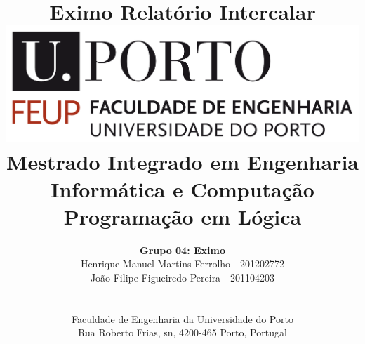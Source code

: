 \documentclass[a4paper]{article}
\begin{document}
\setlength{\textwidth}{16cm}
\setlength{\textheight}{22cm}

\title{\Huge\textbf{Eximo}\linebreak\linebreak\linebreak
\Large\textbf{Relatório Intercalar}\linebreak\linebreak
\linebreak\linebreak
\includegraphics[scale=0.1]{res/feup-logo.png}\linebreak\linebreak
\linebreak\linebreak
\Large{Mestrado Integrado em Engenharia Informática e Computação} \linebreak\linebreak
\Large{Programação em Lógica}\linebreak
}

\author{\textbf{Grupo 04: Eximo}\\
Henrique Manuel Martins Ferrolho -  201202772\\
João Filipe Figueiredo Pereira - 201104203 \\
\linebreak\linebreak \\
 \\ Faculdade de Engenharia da Universidade do Porto \\ Rua Roberto Frias, s\/n, 4200-465 Porto, Portugal \linebreak\linebreak\linebreak
\linebreak\linebreak\vspace{1cm}}

\maketitle
\thispagestyle{empty}
\end{document}
